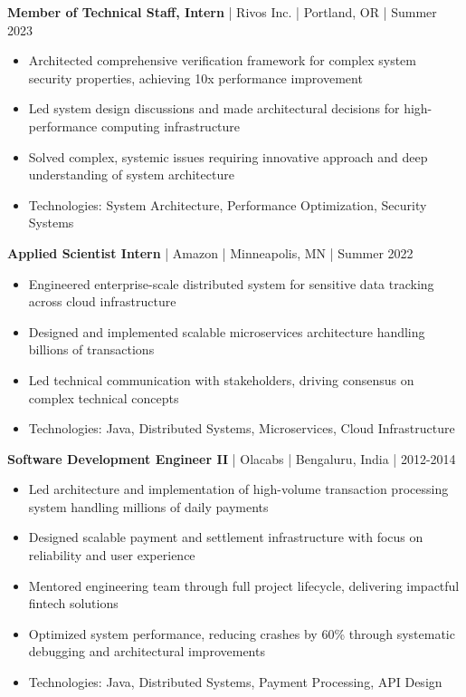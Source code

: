 \documentclass[11pt,letterpaper]{article}
\newcommand{\cventry}[6]{
    \textbf{#1} | #2 | #3 | #4
    \vspace{0.1em}
    #6
    \vspace{0.3em}
}
\begin{document}
\cventry{Member of Technical Staff, Intern}{Rivos Inc.}{Portland, OR}{Summer 2023}{}{
\begin{itemize}
    \item Architected comprehensive verification framework for complex system security properties, achieving 10x performance improvement
    \item Led system design discussions and made architectural decisions for high-performance computing infrastructure
    \item Solved complex, systemic issues requiring innovative approach and deep understanding of system architecture
    \item Technologies: System Architecture, Performance Optimization, Security Systems
\end{itemize}
}

\cventry{Applied Scientist Intern}{Amazon}{Minneapolis, MN}{Summer 2022}{}{
\begin{itemize}
    \item Engineered enterprise-scale distributed system for sensitive data tracking across cloud infrastructure
    \item Designed and implemented scalable microservices architecture handling billions of transactions
    \item Led technical communication with stakeholders, driving consensus on complex technical concepts
    \item Technologies: Java, Distributed Systems, Microservices, Cloud Infrastructure
\end{itemize}
}

\cventry{Software Development Engineer II}{Olacabs}{Bengaluru, India}{2012-2014}{}{
\begin{itemize}
    \item Led architecture and implementation of high-volume transaction processing system handling millions of daily payments
    \item Designed scalable payment and settlement infrastructure with focus on reliability and user experience
    \item Mentored engineering team through full project lifecycle, delivering impactful fintech solutions
    \item Optimized system performance, reducing crashes by 60\% through systematic debugging and architectural improvements
    \item Technologies: Java, Distributed Systems, Payment Processing, API Design
\end{itemize}
}
\end{document}
